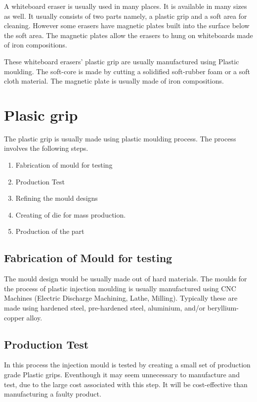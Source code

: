 \documentclass[12pt,a4paper,oneside]{article}
\begin{document}
A whiteboard eraser is usually used in many places. It is available in many sizes as well. It usually consists of two parts namely, a plastic grip and a soft area for cleaning. However some erasers have magnetic plates built into the surface below the soft area. The magnetic plates allow the erasers to hung on whiteboards made of iron compositions. 

These whiteboard erasers’ plastic grip are usually manufactured using Plastic moulding. The soft-core is made by cutting a solidified soft-rubber foam or a soft cloth material. The magnetic plate is usually made of iron compositions. 



\newpage
\section{Plasic grip}

The plastic grip is usually made using plastic moulding process. The process involves the following steps. 

\begin{enumerate}
    \item Fabrication of mould for testing
    \item Production Test
    \item Refining the mould designs
    \item Creating of die for mass production.
    \item Production of the part
\end{enumerate}


\subsection{Fabrication of Mould for testing}

The mould design would be usually made out of hard materials. The moulds for the process of plastic injection moulding is usually manufactured using CNC Machines (Electric Discharge Machining, Lathe, Milling). Typically these are made using hardened steel, pre-hardened steel, aluminium, and/or beryllium-copper alloy.

\subsection{Production Test}

In this process the injection mould is tested by creating a small set of production grade Plastic grips. Eventhough it may seem unnecessary to manufacture and test, due to the large cost associated with this step. It will be cost-effective than manufacturing a faulty product.
\end{document}
